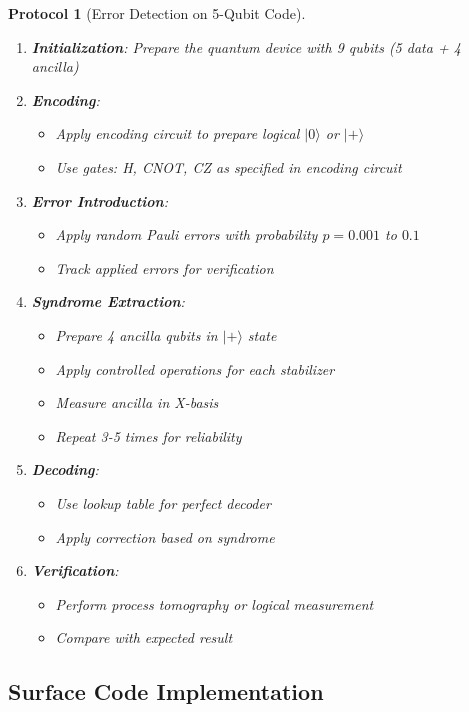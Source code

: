 \documentclass[12pt,a4paper]{article}
\newtheorem{protocol}[theorem]{Protocol}
\begin{document}
\begin{protocol}[Error Detection on 5-Qubit Code]
\begin{enumerate}
\item \textbf{Initialization}: Prepare the quantum device with 9 qubits (5 data + 4 ancilla)
\item \textbf{Encoding}: 
   \begin{itemize}
   \item Apply encoding circuit to prepare logical $|0\rangle$ or $|+\rangle$
   \item Use gates: H, CNOT, CZ as specified in encoding circuit
   \end{itemize}
\item \textbf{Error Introduction}: 
   \begin{itemize}
   \item Apply random Pauli errors with probability $p = 0.001$ to $0.1$
   \item Track applied errors for verification
   \end{itemize}
\item \textbf{Syndrome Extraction}:
   \begin{itemize}
   \item Prepare 4 ancilla qubits in $|+\rangle$ state
   \item Apply controlled operations for each stabilizer
   \item Measure ancilla in X-basis
   \item Repeat 3-5 times for reliability
   \end{itemize}
\item \textbf{Decoding}:
   \begin{itemize}
   \item Use lookup table for perfect decoder
   \item Apply correction based on syndrome
   \end{itemize}
\item \textbf{Verification}:
   \begin{itemize}
   \item Perform process tomography or logical measurement
   \item Compare with expected result
   \end{itemize}
\end{enumerate}
\end{protocol}

\subsection{Surface Code Implementation}
\end{document}
